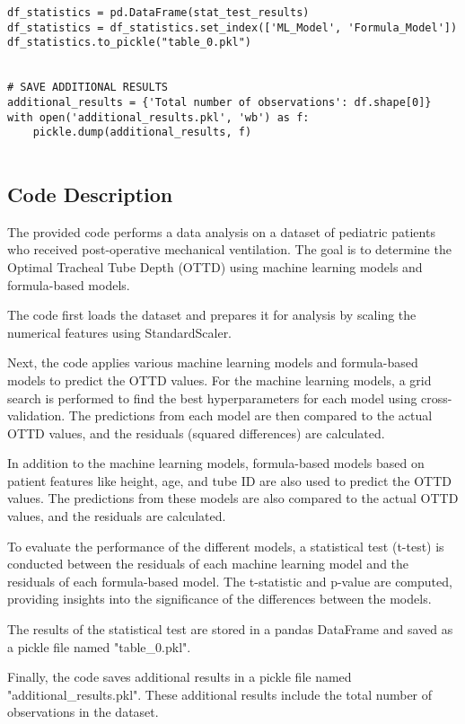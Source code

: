 \documentclass[11pt]{article}
\begin{document}
\begin{verbatim}
df_statistics = pd.DataFrame(stat_test_results)
df_statistics = df_statistics.set_index(['ML_Model', 'Formula_Model'])
df_statistics.to_pickle("table_0.pkl")


# SAVE ADDITIONAL RESULTS
additional_results = {'Total number of observations': df.shape[0]}
with open('additional_results.pkl', 'wb') as f:
    pickle.dump(additional_results, f)


\end{verbatim}

\subsection{Code Description}

The provided code performs a data analysis on a dataset of pediatric patients who received post-operative mechanical ventilation. The goal is to determine the Optimal Tracheal Tube Depth (OTTD) using machine learning models and formula-based models. 

The code first loads the dataset and prepares it for analysis by scaling the numerical features using StandardScaler. 

Next, the code applies various machine learning models and formula-based models to predict the OTTD values. For the machine learning models, a grid search is performed to find the best hyperparameters for each model using cross-validation. The predictions from each model are then compared to the actual OTTD values, and the residuals (squared differences) are calculated.

In addition to the machine learning models, formula-based models based on patient features like height, age, and tube ID are also used to predict the OTTD values. The predictions from these models are also compared to the actual OTTD values, and the residuals are calculated.

To evaluate the performance of the different models, a statistical test (t-test) is conducted between the residuals of each machine learning model and the residuals of each formula-based model. The t-statistic and p-value are computed, providing insights into the significance of the differences between the models.

The results of the statistical test are stored in a pandas DataFrame and saved as a pickle file named "table\_0.pkl".

Finally, the code saves additional results in a pickle file named "additional\_results.pkl". These additional results include the total number of observations in the dataset.
\end{document}
